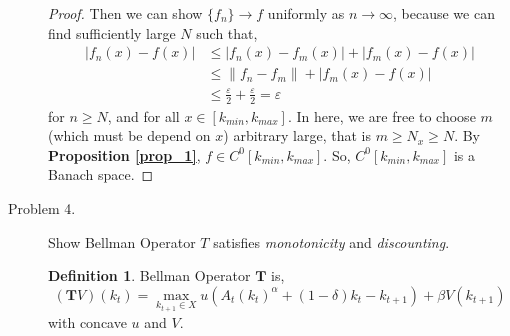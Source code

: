 \documentclass[a4paper, 10pt]{article}
\theoremstyle{definition}
\newtheorem{defn}{Definition}
\begin{document}
\begin{description}
\begin{proof}
 		Then we can show $\{f_n\} \rightarrow f$ uniformly as $n \rightarrow \infty$, because we can find sufficiently large $N$ such that,
		\begin{displaymath}\begin{split}
			|f_n(x) - f(x)| &\leq |f_n(x) - f_m(x)| + |f_m(x) - f(x)| \\
						 &\leq \| f_n - f_m \| + |f_m(x) - f(x)| \\
						&\leq  \frac{\varepsilon}{2} + \frac{\varepsilon}{2} = \varepsilon
		\end{split}
		\end{displaymath}
		for $ n \geq N$, and for all $ x \in [k_{min}, k_{max}]$. In here, we are free to choose $m$ (which must be depend on $x$) arbitrary large, that is $m \geq N_x \geq N$.
		By \textbf{Proposition \ref{prop_1}}, $f \in C^0[k_{min},k_{max}]$. So, $C^0[k_{min}, k_{max}] $ is a Banach space.

		\end{proof}

	\item[Problem 4.] Show Bellman Operator $T$ satisfies \textit{monotonicity} and \textit{discounting}.
		
		\begin{defn}
			Bellman Operator $\textbf{T}$ is,
			\begin{displaymath}
				(\textbf{T}V)(k_t) = \max_{k_{t+1}\in X} u(A_t(k_t)^\alpha + (1-\delta)k_t - k_{t+1}) + \beta V(k_{t+1})
			\end{displaymath}
			with concave $u$ and $V$.
		\end{defn}


\end{description}
\end{document}
